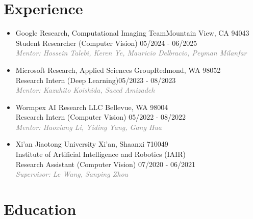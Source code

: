\documentclass[10pt,margin,line,pifont,palatino,courier]{res}
\begin{document}
\begin{resume}
\section{\sc Experience}

\begin{itemize}[leftmargin=*]
    \item Google Research, Computational Imaging Team\hfill Mountain View, CA 94043\\
        Student Researcher (Computer Vision) \hfill 05/2024 - 06/2025\\
        \textcolor{gray}{\small\it Mentor: Hossein Talebi, Keren Ye, Mauricio Delbracio, Peyman Milanfar}
	\item Microsoft Research, Applied Sciences Group\hfill Redmond, WA 98052\\
        Research Intern (Deep Learning)\hfill 05/2023 - 08/2023\\
        \textcolor{gray}{\small\it Mentor: Kazuhito Koishida, Saeed Amizadeh}
    \item Wormpex AI Research LLC \hfill Bellevue, WA 98004\\
        Research Intern (Computer Vision) \hfill 05/2022 - 08/2022\\
        \textcolor{gray}{\small\it Mentor: Haoxiang Li, Yiding Yang, Gang Hua}
	\item Xi'an Jiaotong University \hfill Xi'an, Shaanxi 710049\\
        Institute of Artificial Intelligence and Robotics (IAIR) \\
        Research Assistant (Computer Vision) \hfill 07/2020 - 06/2021\\
        \textcolor{gray}{\small\it Supervisor: Le Wang, Sanping Zhou}
\end{itemize}

\section{\sc Education}


\end{resume}
\end{document}
